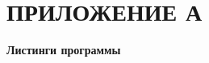 \clearpage
\section*{ПРИЛОЖЕНИЕ А}
{}
\begin{center}
	\bfseries Листинги программы
\end{center}

\setcounter{lstlisting}{0}
\renewcommand{\thelstlisting}{А.\arabic{lstlisting}}




